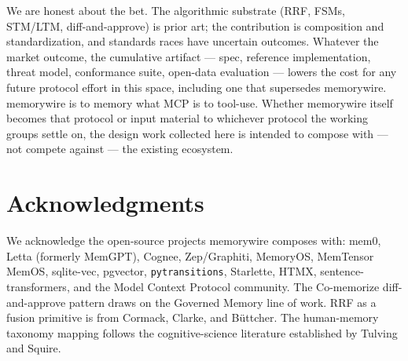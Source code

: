 \documentclass[11pt,letterpaper,twocolumn]{article}
\begin{document}
We are honest about the bet. The algorithmic substrate (RRF, FSMs, STM/LTM, diff-and-approve) is prior art; the contribution is composition and standardization, and standards races have uncertain outcomes. Whatever the market outcome, the cumulative artifact --- spec, reference implementation, threat model, conformance suite, open-data evaluation --- lowers the cost for any future protocol effort in this space, including one that supersedes memorywire. memorywire is to memory what MCP is to tool-use. Whether memorywire itself becomes that protocol or input material to whichever protocol the working groups settle on, the design work collected here is intended to compose with --- not compete against --- the existing ecosystem.

\section*{Acknowledgments}

We acknowledge the open-source projects memorywire composes with: mem0, Letta (formerly MemGPT), Cognee, Zep/Graphiti, MemoryOS, MemTensor MemOS, sqlite-vec, pgvector, \texttt{pytransitions}, Starlette, HTMX, sentence-transformers, and the Model Context Protocol community. The Co-memorize diff-and-approve pattern draws on the Governed Memory line of work. RRF as a fusion primitive is from Cormack, Clarke, and B{\"u}ttcher. The human-memory taxonomy mapping follows the cognitive-science literature established by Tulving and Squire.



\end{document}
